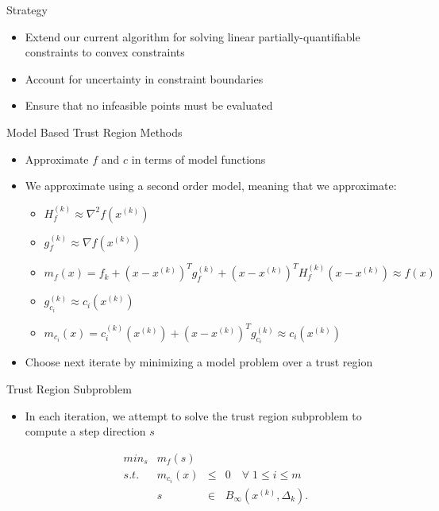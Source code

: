 \documentclass{beamer}
\newcommand{\xk}{{{x}^{(k)}}}
\newcommand{\dk}{{\Delta_k}}
\newcommand{\mk}{{m_f}}
\newcommand{\fk}{{f_k}}
\newcommand{\fgk}{{g^{(k)}_f}}
\newcommand{\fhk}{{H^{(k)}_f}}
\newcommand{\ck}{{c^{(k)}_{i}(\xk)}}
\newcommand{\cgk}{{g^{(k)}_{c_i}}}
\newcommand{\mck}{{m_{c_i}}}
\newcommand{\bk}{{B_{\infty}(\xk, \dk)}}
\begin{document}
\begin{frame}{Strategy}
    \begin{itemize}
        \item Extend our current algorithm for solving linear partially-quantifiable constraints to convex constraints
        \item Account for uncertainty in constraint boundaries
        \item Ensure that no infeasible points must be evaluated
    \end{itemize}
\end{frame}





\begin{frame}{Model Based Trust Region Methods}
    \begin{itemize}
        \setlength\itemsep{2em}
    	\item Approximate $f$ and $c$ in terms of model functions
    	\item We approximate using a second order model, meaning that we approximate:
    	\begin{itemize}
            \item $\fhk \approx \nabla ^2 f(\xk)$
            \item $\fgk \approx \nabla f(\xk)$
            \item $\mk(x) = \fk + \left(x - \xk \right)^T\fgk + \left(x - \xk \right)^T\fhk\left(x - \xk \right) \approx f(x)$
            \item $\cgk \approx c_i(\xk)$
            \item $\mck(x) = \ck + \left(x - \xk\right)^T\cgk \approx c_i(\xk)$
    	\end{itemize}
	    \item Choose next iterate by minimizing a model problem over a trust region
	\end{itemize}
\end{frame}



\begin{frame}{Trust Region Subproblem}
    \begin{itemize}
        \item In each iteration, we attempt to solve the trust region subproblem to compute a step direction $s$

        \begin{displaymath}
\begin{array}{lrcc}
min_s & \mk(s)   &     &            \\
s.t.  &  \mck(x) & \le & 0   \quad \forall \; 1 \le i \le m       \\
      &  s & \in & \bk.  \\
\end{array}
        \end{displaymath}
    \end{itemize}
\end{frame}
\end{document}
